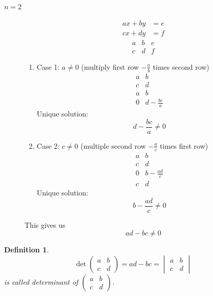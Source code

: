\documentclass[a4paper,landscape,twocolumn]{article}
\newtheorem{defi}{Definition}
\begin{document}
\begin{description}
  \item[$n=2$]
    \begin{align*}
      ax + by &= e \\
      cx + dy &= f
    \end{align*}
    \[
      \begin{array}{cc|c}
        a & b & e \\
        c & d & f
      \end{array}
    \]
    \begin{enumerate}
      \item Case 1: $a \neq 0$ (multiply first row $-\frac{a}{b}$ times second row)
        \[
          \begin{array}{cc}
            a & b \\
            c & d \\
          \hline
            a & b \\
            0 & d - \frac{bc}{a}
          \end{array}
        \]
        Unique solution:
        \[ d - \frac{bc}{a} \neq 0 \]

      \item Case 2: $c \neq 0$ (multiple second row $-\frac{a}{c}$ times first row)
        \[
          \begin{array}{cc}
            a & b \\
            c & d \\
          \hline
            0 & b-\frac{ad}{c} \\
            c & d
          \end{array}
        \]
        Unique solution:
        \[ b - \frac{ad}{c} \neq 0 \]
    \end{enumerate}

    This gives us
    \[ ad - bc \neq 0 \]
\end{description}

\begin{defi}
  \[ \det\begin{pmatrix} a & b \\ c & d \end{pmatrix} = ad - bc = \begin{vmatrix} a & b \\ c & d \end{vmatrix} \]
  is called \emph{determinant} of $\begin{pmatrix} a & b \\ c & d \end{pmatrix}$.
\end{defi}
\end{document}
